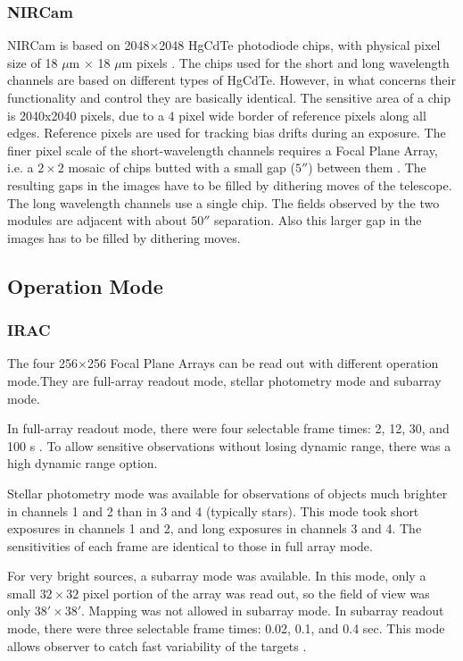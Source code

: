 \documentclass[preprint, 12pt]{aastex} \synctex=1
\begin{document}
\subsubsection{NIRCam}

NIRCam is based on 2048$\times$2048 HgCdTe photodiode chips, with
physical pixel size of 18 $\mu$m $\times$ 18 $\mu$m pixels
\citep{2005SPIE.5904...21B}. The chips used for the short and long
wavelength channels are based on different types of HgCdTe. However,
in what concerns their functionality and control they are basically
identical.  The sensitive area of a chip is 2040x2040 pixels, due to a
4 pixel wide border of reference pixels along all edges. Reference
pixels are used for tracking bias drifts during an exposure.  The
finer pixel scale of the short-wavelength channels requires a Focal
Plane Array, i.e. a $2\times2$ mosaic of chips butted with a small gap ($5''$)
between them \citep{2005SPIE.5904...21B}. The resulting gaps in the
images have to be filled by dithering moves of the telescope. The long
wavelength channels use a single chip.  The fields observed by the two
modules are adjacent with about $50''$ separation. Also this larger gap
in the images has to be filled by dithering moves.


\subsection{Operation Mode}
\subsubsection{IRAC}

The four 256$\times$256 Focal Plane Arrays can be read out with
different operation mode.They are full-array readout mode, stellar
photometry mode and subarray mode.\par

In full-array readout mode, there were four selectable frame times: 2,
12, 30, and 100 s \citep{2004ApJS..154...10F}. To allow sensitive
observations without losing dynamic range, there was a high dynamic
range option.

Stellar photometry mode was available for observations of objects much
brighter in channels 1 and 2 than in 3 and 4 (typically stars). This
mode took short exposures in channels 1 and 2, and long exposures in
channels 3 and 4.  The sensitivities of each frame are identical to
those in full array mode.

For very bright sources, a subarray mode was available. In this mode,
only a small $32 \times 32$ pixel portion of the array was read out,
so the field of view was only $38' \times 38'$. Mapping was not
allowed in subarray mode.  In subarray readout mode, there were three
selectable frame times: 0.02, 0.1, and 0.4 sec. This mode allows
observer to catch fast variability of the targets \citep{2004ApJS..154...10F}.
\end{document}
